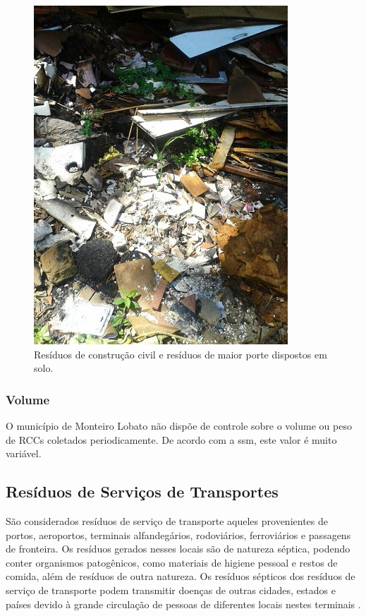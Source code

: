 \clearpage	
	\begin{figure}
		\centering
		\includegraphics[width=0.75\linewidth]{produtos/prodtres/image085}
		\caption{Resíduos de construção civil e resíduos de maior porte dispostos em solo.}
		\label{fig:image085}
	\end{figure}

	
	\subsubsection{Volume}
	O município de Monteiro Lobato não dispõe de controle sobre o volume ou peso de RCCs coletados periodicamente. De acordo com a \gls{ssm}, este valor é muito variável.
	
	
	\subsection{Resíduos de Serviços de Transportes}
	
	São considerados resíduos de serviço de transporte aqueles provenientes de portos, aeroportos, terminais alfandegários, rodoviários, ferroviários e passagens de fronteira. Os resíduos gerados nesses locais são de natureza séptica, podendo conter organismos patogênicos, como materiais de higiene pessoal e restos de comida, além de resíduos de outra natureza. Os resíduos sépticos dos resíduos de serviço de transporte podem transmitir doenças de outras cidades, estados e países devido à grande circulação de pessoas de diferentes locais nestes terminais \cite{brasil:12305}.
	
